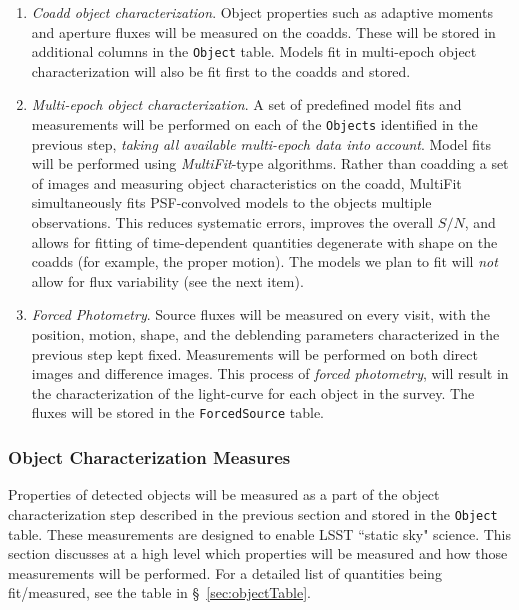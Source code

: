 \documentclass[12pt]{article}
\newcommand{\code}[1]{\texttt{#1}}
\newcommand{\Object}{\code{Object}\xspace}
\newcommand{\Objects}{\code{Objects}\xspace}
\newcommand{\ForcedSource}{\code{ForcedSource}\xspace}
\begin{document}
\begin{enumerate}
    The deblender will make use of all information available at this stage, including the knowledge of peak positions, bands, time, time variability (from Level 1), Galactic longitude and latitude, etc. The output of this stage is a list of uncharacterized \Objects\footnote{Depending on the exact implementation of the deblender, this stage may also attach significant metadata (eg, deblended footprints and pixel-weight maps) to each deblended \Object record.}.
    \item {\em Coadd object characterization}.  Object properties such as adaptive moments and aperture fluxes will be measured on the coadds.  These will be stored in additional columns in the \Object table.  Models fit in multi-epoch object characterization will also be fit first to the coadds and stored.
    \item {\em Multi-epoch object characterization}. A set of predefined model fits and measurements will be performed on each of the \Objects identified in the previous step, {\it taking all available multi-epoch data into account}. Model fits will be performed using {\em MultiFit}-type algorithms. Rather than coadding a set of images and measuring object characteristics on the coadd, MultiFit simultaneously fits PSF-convolved models to the objects multiple observations. This reduces systematic errors, improves the overall $S/N$, and allows for fitting of time-dependent quantities degenerate with shape on the coadds (for example, the proper motion). The models we plan to fit will {\em not} allow for flux variability (see the next item).
    \item {\em Forced Photometry}. Source fluxes will be measured on every visit, with the position, motion, shape, and the deblending parameters characterized in the previous step kept fixed.
Measurements will be performed on both direct images and difference images.
This process of {\em forced photometry}, will result in the characterization of the light-curve for each object in the survey. The fluxes will be stored in the \ForcedSource table.
\end{enumerate}

\subsubsection{Object Characterization Measures}

Properties of detected objects will be measured as a part of the object characterization step described in the previous section and stored in the \Object table. These measurements are designed to enable LSST ``static sky" science. This section discusses at a high level which properties will be measured and how those measurements will be performed. For a detailed list of quantities being fit/measured, see the table in \S~\ref{sec:objectTable}.
\end{document}
